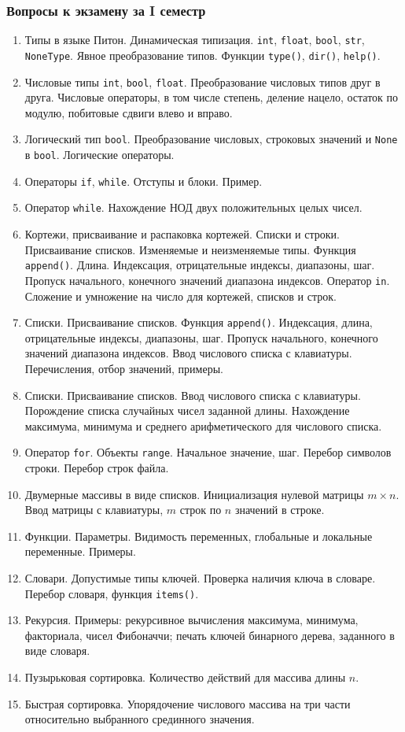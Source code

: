 \documentclass[a4paper,12pt]{article}
\begin{document}
\subsubsection*{Вопросы к экзамену за I семестр}
\begin{enumerate}
\item
Типы в языке Питон. Динамическая типизация. \texttt{int}, \texttt{float}, \texttt{bool}, \texttt{str}, \texttt{NoneType}. Явное преобразование типов. Функции \texttt{type()}, \texttt{dir()}, \texttt{help()}.
\item
Числовые типы \texttt{int}, \texttt{bool}, \texttt{float}. Преобразование числовых типов друг в друга. Числовые операторы, в том числе степень, деление нацело, остаток по модулю, побитовые сдвиги влево и вправо.
\item
Логический тип \texttt{bool}. Преобразование числовых, строковых значений и \texttt{None} в \texttt{bool}. Логические операторы.
\item
Операторы \texttt{if}, \texttt{while}. Отступы и блоки. Пример.
\item
Оператор \texttt{while}. Нахождение НОД двух положительных целых чисел.
\item
Кортежи, присваивание и распаковка кортежей. Списки и строки. Присваивание списков. Изменяемые и неизменяемые типы. Функция \texttt{append()}.  Длина. Индексация, отрицательные индексы, диапазоны, шаг. Пропуск начального, конечного значений диапазона индексов. Оператор \texttt{in}. Сложение и умножение на число для кортежей, списков и строк.
\item
Списки. Присваивание списков. Функция \texttt{append()}. Индексация, длина, отрицательные индексы, диапазоны, шаг. Пропуск начального, конечного значений диапазона индексов. Ввод числового списка с клавиатуры. Перечисления, отбор значений, примеры.
\item
Списки. Присваивание списков. Ввод числового списка с клавиатуры. Порождение списка случайных чисел заданной длины. Нахождение максимума, минимума и среднего арифметического для числового списка.
\item
Оператор \texttt{for}. Объекты \texttt{range}. Начальное значение, шаг. Перебор символов строки. Перебор строк файла.
\item
Двумерные массивы в виде списков. Инициализация нулевой матрицы $m \times n$. Ввод матрицы с клавиатуры, $m$ строк по $n$ значений в строке.
\item
Функции. Параметры. Видимость переменных, глобальные и локальные переменные. Примеры.
\item
Словари. Допустимые типы ключей. Проверка наличия ключа в словаре. Перебор словаря, функция \texttt{items()}.
\item
Рекурсия. Примеры: рекурсивное вычисления максимума, минимума, факториала, чисел Фибоначчи; печать ключей бинарного дерева, заданного в виде словаря.
\item
Пузырьковая сортировка. Количество действий для массива длины $n$.
\item
Быстрая сортировка. Упорядочение числового массива на три части относительно выбранного срединного значения.
\end{enumerate}
{}
\end{document}
